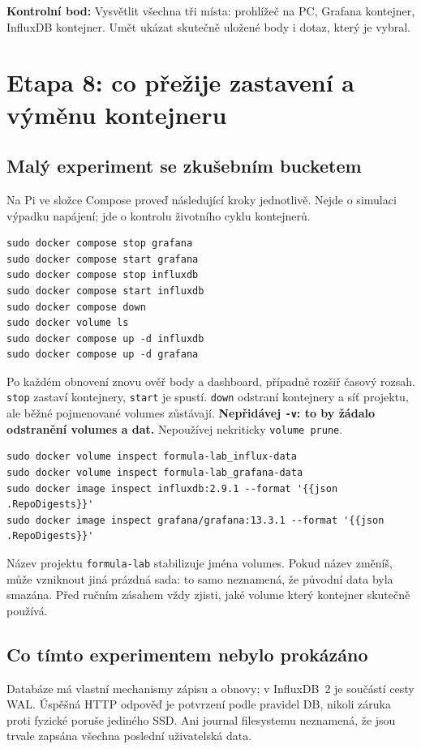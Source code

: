 \documentclass[11pt,a4paper]{article}
\newcommand{\kontrola}[1]{\par\noindent\textbf{Kontrolní bod:} #1\par}
\begin{document}
\kontrola{Vysvětlit všechna tři místa: prohlížeč na PC, Grafana kontejner, InfluxDB kontejner. Umět ukázat skutečně uložené body i dotaz, který je vybral.}

\clearpage
\section{Etapa 8: co přežije zastavení a výměnu kontejneru}
\subsection{Malý experiment se zkušebním bucketem}
Na Pi ve složce Compose proveď následující kroky jednotlivě. Nejde o simulaci výpadku napájení; jde o kontrolu životního cyklu kontejnerů.
\begin{lstlisting}
sudo docker compose stop grafana
sudo docker compose start grafana
sudo docker compose stop influxdb
sudo docker compose start influxdb
sudo docker compose down
sudo docker volume ls
sudo docker compose up -d influxdb
sudo docker compose up -d grafana
\end{lstlisting}
Po každém obnovení znovu ověř body a dashboard, případně rozšiř časový rozsah. \texttt{stop} zastaví kontejnery, \texttt{start} je spustí. \texttt{down} odstraní kontejnery a síť projektu, ale běžné pojmenované volumes zůstávají. \textbf{Nepřidávej \texttt{-v}: to by žádalo odstranění volumes a dat.} Nepoužívej nekriticky \texttt{volume prune}.\cite{volumes}

\begin{lstlisting}
sudo docker volume inspect formula-lab_influx-data
sudo docker volume inspect formula-lab_grafana-data
sudo docker image inspect influxdb:2.9.1 --format '{{json .RepoDigests}}'
sudo docker image inspect grafana/grafana:13.3.1 --format '{{json .RepoDigests}}'
\end{lstlisting}
Název projektu \texttt{formula-lab} stabilizuje jména volumes. Pokud název změníš, může vzniknout jiná prázdná sada: to samo neznamená, že původní data byla smazána. Před ručním zásahem vždy zjisti, jaké volume který kontejner skutečně používá.

\subsection{Co tímto experimentem nebylo prokázáno}
Databáze má vlastní mechanismy zápisu a obnovy; v InfluxDB~2 je součástí cesty WAL. Úspěšná HTTP odpověď je potvrzení podle pravidel DB, nikoli záruka proti fyzické poruše jediného SSD. Ani journal filesystemu neznamená, že jsou trvale zapsána všechna poslední uživatelská data.\cite{influx-storage,fsync}
\end{document}
